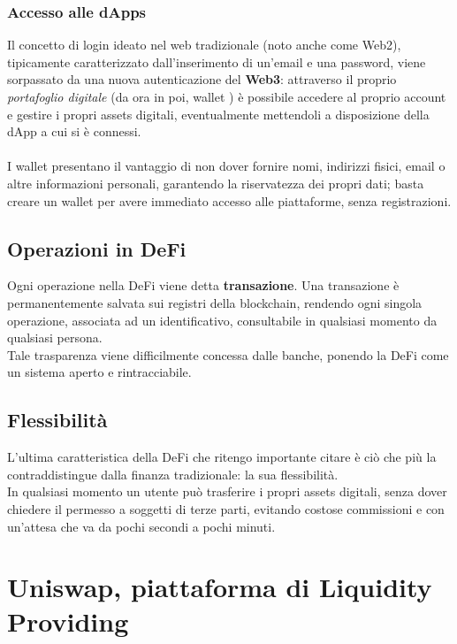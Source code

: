 \documentclass[12pt,a4paper]{report}
\begin{document}
\subsection{Accesso alle dApps}

Il concetto di login ideato nel web tradizionale (noto anche come Web2), tipicamente caratterizzato dall'inserimento di un'email e una password, viene sorpassato da una nuova autenticazione del \textbf{Web3}\cite{web2_web3}: attraverso il proprio \textit{portafoglio digitale} (da ora in poi, wallet \cite{wallet}) è possibile accedere al proprio account e gestire i propri assets digitali, eventualmente mettendoli a disposizione della dApp a cui si è connessi.
\\\\I wallet presentano il vantaggio di non dover fornire nomi, indirizzi fisici, email o altre informazioni personali, garantendo la riservatezza dei propri dati; basta creare un wallet per avere immediato accesso alle piattaforme, senza registrazioni.


\section{Operazioni in DeFi}
Ogni operazione nella DeFi viene detta \textbf{transazione}. Una transazione è permanentemente salvata sui registri della blockchain, rendendo ogni singola operazione, associata ad un identificativo, consultabile in qualsiasi momento da qualsiasi persona.
\\Tale trasparenza viene difficilmente concessa dalle banche, ponendo la DeFi come un sistema aperto e rintracciabile.

\section{Flessibilità}

L'ultima caratteristica della DeFi che ritengo importante citare è ciò che più la contraddistingue dalla finanza tradizionale: la sua flessibilità.\\
In qualsiasi momento un utente può trasferire i propri assets digitali, senza dover chiedere il permesso a soggetti di terze parti, evitando costose commissioni e con un'attesa che va da pochi secondi a pochi minuti. 


\chapter{Uniswap, piattaforma di Liquidity Providing}
\end{document}
